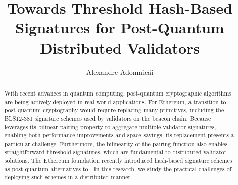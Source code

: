 \documentclass{iacrtrans}
\author{Alexandre Adomnic\u{a}i}%
\institute{
  DV Labs, \email{alexandre@dvlabs.tech}
}
\title{Towards Threshold Hash-Based Signatures for Post-Quantum Distributed Validators}
\begin{document}
\maketitle




\begin{abstract}
With recent advances in quantum computing, post-quantum cryptographic algorithms are being actively deployed in real-world applications.
For Ethereum, a transition to post-quantum cryptography would require replacing many primitives, including the \textsf{BLS12-381} signature schemes used by validators on the beacon chain.
Because \BLS leverages its bilinear pairing property to aggregate multiple validator signatures, enabling both performance improvements and space savings, its replacement presents a particular challenge.
Furthermore, the bilinearity of the pairing function also enables straightforward threshold signatures, which are fundamental to distributed validator solutions.
The Ethereum foundation recently introduced hash-based signature schemes as post-quantum alternatives to \BLS. 
In this research, we study the practical challenges of deploying such schemes in a distributed manner.
\end{abstract}














\end{document}
